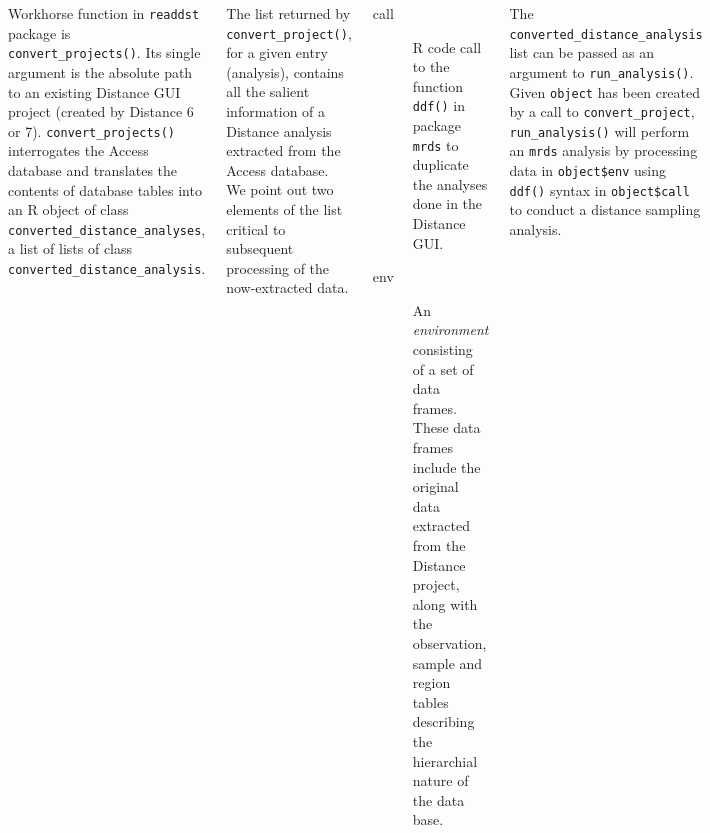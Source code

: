 \documentclass[14pt,a1paper,landscape]{tikzposter}
\begin{document}
\begin{columns}
{
	Workhorse function in \texttt{readdst} package is \texttt{convert\_projects()}.  Its single argument is the absolute path to an existing Distance GUI project (created by Distance 6 or 7).  \texttt{convert\_projects()} interrogates the Access database and translates the contents of database tables into an R object of class \texttt{converted\_distance\_analyses}, a list of lists of class \texttt{converted\_distance\_analysis}.
}
	
%	
%	


{
	
	The list returned by \texttt{convert\_project()}, for a given entry (analysis), contains all the salient information of a Distance analysis extracted from the Access database.  We point out two elements of the list critical to subsequent processing of the now-extracted data.
	\begin{description}
		\item [call] R code call to the function \texttt{ddf()} in package \texttt{mrds} to duplicate the analyses done in the Distance GUI.
		\item [env] An \textit{environment} consisting of a set of data frames.  These data frames include the original data extracted from the Distance project, along with the observation, sample and region tables describing the hierarchial nature of the data base.
	\end{description}
	
	The \texttt{converted\_distance\_analysis} list can be passed as an argument to \texttt{run\_analysis()}.  Given \texttt{object} has been created by a call to \texttt{convert\_project}, \texttt{run\_analysis()} will perform an \texttt{mrds} analysis by processing data in \texttt{object\$env} using \texttt{ddf()} syntax in \texttt{object\$call} to conduct a distance sampling analysis.
} 



\end{columns}
\end{document}
